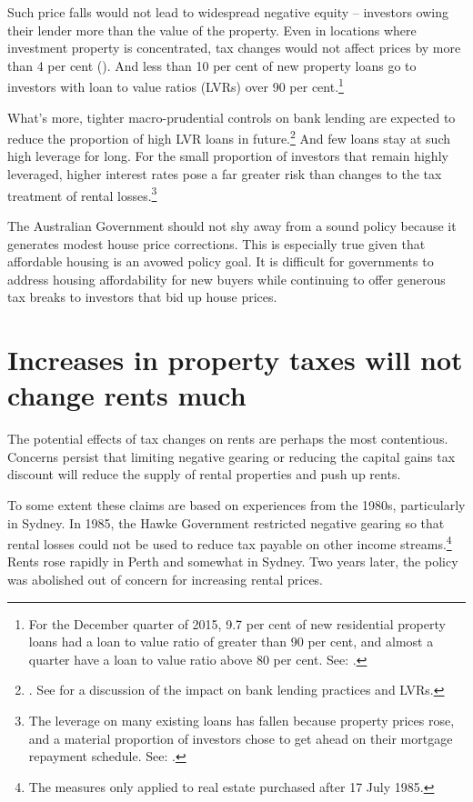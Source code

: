 \documentclass{grattanAlpha}\usepackage[]{graphicx}\usepackage[]{color}
\begin{document}
Such price falls would not lead to widespread negative equity – investors owing their lender more than the value of the property. Even in locations where investment property is concentrated, tax changes would not affect prices by more than 4 per cent (). And less than 10 per cent of new property loans go to investors with loan to value ratios (LVRs) over 90 per cent.\footnote{For the December quarter of 2015, 9.7 per cent of new residential property loans had a loan to value ratio of greater than 90 per cent, and almost a quarter have a loan to value ratio above 80 per cent. See: \textcite{APRA2016PropertyExposures}.}

What’s more, tighter macro-prudential controls on bank lending are expected to reduce the proportion of high LVR loans in future.\footnote{\textcite{APRA2014a}. See \textcite{Schlesinger2015} for a discussion of the impact on bank lending practices and LVRs.}  
  And few loans stay at such high leverage for long.  For the small proportion of investors that remain highly leveraged, higher interest rates pose a far greater risk than changes to the tax treatment of rental losses.\footnote{The leverage on many existing loans has fallen because property prices rose, and a material proportion of investors chose to get ahead on their mortgage repayment schedule. See: \textcite{RBA2015StatsMarginLending}.} 

The Australian Government should not shy away from a sound policy because it generates modest house price corrections. 
This is especially true given that affordable housing is an avowed policy goal. It is difficult for governments to address housing affordability for new buyers while continuing to offer generous tax breaks to investors that bid up house prices. 

\section{Increases in property taxes will not change rents much}\label{sec:Increases-property-taxes-will-not-change-rents}
The potential effects of tax changes on rents are perhaps the most contentious. Concerns persist that limiting negative gearing or reducing the capital gains tax discount will reduce the supply of rental properties and push up rents. 

To some extent these claims are based on experiences from the 1980s, particularly in Sydney. 
In 1985, the Hawke Government restricted negative gearing so that rental losses could not be used to reduce tax payable on other income streams.\footnote{\textcite[][20]{McKellInstitute2015SwitchingGears}  The measures only applied to real estate purchased after 17 July 1985.}
Rents rose rapidly in Perth and somewhat in Sydney. 
Two years later, the policy was abolished out of concern for increasing rental prices. 
\end{document}
